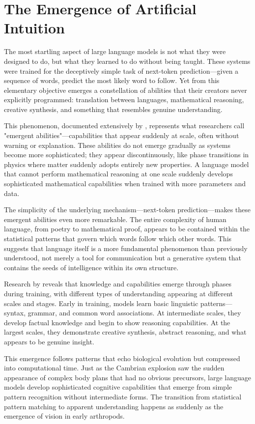 \section{The Emergence of Artificial Intuition}

The most startling aspect of large language models is not what they were designed to do, but what they learned to do without being taught. These systems were trained for the deceptively simple task of next-token prediction—given a sequence of words, predict the most likely word to follow. Yet from this elementary objective emerges a constellation of abilities that their creators never explicitly programmed: translation between languages, mathematical reasoning, creative synthesis, and something that resembles genuine understanding.

This phenomenon, documented extensively by \textcite{wei2022emergent}, represents what researchers call "emergent abilities"—capabilities that appear suddenly at scale, often without warning or explanation. These abilities do not emerge gradually as systems become more sophisticated; they appear discontinuously, like phase transitions in physics where matter suddenly adopts entirely new properties. A language model that cannot perform mathematical reasoning at one scale suddenly develops sophisticated mathematical capabilities when trained with more parameters and data.

The simplicity of the underlying mechanism—next-token prediction—makes these emergent abilities even more remarkable. The entire complexity of human language, from poetry to mathematical proof, appears to be contained within the statistical patterns that govern which words follow which other words. This suggests that language itself is a more fundamental phenomenon than previously understood, not merely a tool for communication but a generative system that contains the seeds of intelligence within its own structure.

Research by \textcite{sawmya2025birth} reveals that knowledge and capabilities emerge through phases during training, with different types of understanding appearing at different scales and stages. Early in training, models learn basic linguistic patterns—syntax, grammar, and common word associations. At intermediate scales, they develop factual knowledge and begin to show reasoning capabilities. At the largest scales, they demonstrate creative synthesis, abstract reasoning, and what appears to be genuine insight.

This emergence follows patterns that echo biological evolution but compressed into computational time. Just as the Cambrian explosion saw the sudden appearance of complex body plans that had no obvious precursors, large language models develop sophisticated cognitive capabilities that emerge from simple pattern recognition without intermediate forms. The transition from statistical pattern matching to apparent understanding happens as suddenly as the emergence of vision in early arthropods.

